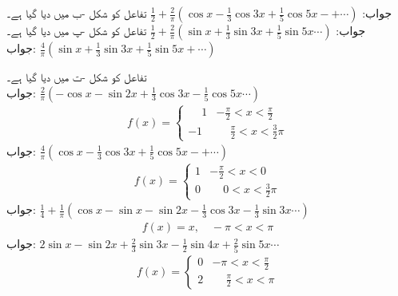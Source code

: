 جواب:\quad
$\tfrac{1}{2}+\tfrac{2}{\pi}(\cos x-\tfrac{1}{3}\cos 3x+\tfrac{1}{5}\cos 5x-+\cdots)$
\quad تفاعل کو شکل -ب میں دیا گیا ہے۔\\
جواب:\quad
$\tfrac{1}{2}+\tfrac{2}{\pi}(\sin x+\tfrac{1}{3}\sin 3x+\tfrac{1}{5}\sin 5x\cdots)$
\quad تفاعل کو شکل -پ میں دیا گیا ہے۔\\
جواب:\quad
$\tfrac{4}{\pi}(\sin x+\tfrac{1}{3}\sin 3x+\tfrac{1}{5}\sin 5x+\cdots)$

\quad تفاعل کو شکل -ت میں دیا گیا ہے۔\\
جواب:\quad
$\tfrac{2}{\pi}(-\cos x-\sin 2x+\tfrac{1}{3}\cos 3x-\tfrac{1}{5}\cos 5x\cdots)$
\begin{align*}
f(x)=
\begin{cases}
\phantom{-}1& -\frac{\pi}{2}<x<\frac{\pi}{2}\\
-1&\phantom{-}\frac{\pi}{2}<x<\frac{3}{2}\pi
\end{cases}
\end{align*}
جواب:\quad
$\tfrac{4}{\pi}(\cos x-\tfrac{1}{3}\cos 3x+\tfrac{1}{5}\cos 5x-+\cdots)$
\begin{align*}
f(x)=
\begin{cases}
1& -\frac{\pi}{2}<x<0\\
0&\phantom{-}0<x<\frac{3}{2}\pi
\end{cases}
\end{align*}
جواب:\quad
$\tfrac{1}{4}+\tfrac{1}{\pi}(\cos x-\sin x-\sin 2x-\tfrac{1}{3}\cos 3x-\tfrac{1}{3}\sin 3x\cdots)$
\begin{align*}
f(x)=x,\quad -\pi<x<\pi
\end{align*}
جواب:\quad
$2\sin x-\sin 2x+\tfrac{2}{3}\sin 3x-\tfrac{1}{2}\sin 4x+\tfrac{2}{5}\sin 5x\cdots$
\begin{align*}
f(x)=
\begin{cases}
0& -\pi<x<\tfrac{\pi}{2}\\
2 & \phantom{-}\tfrac{\pi}{2}<x<\pi
\end{cases}
\end{align*}
